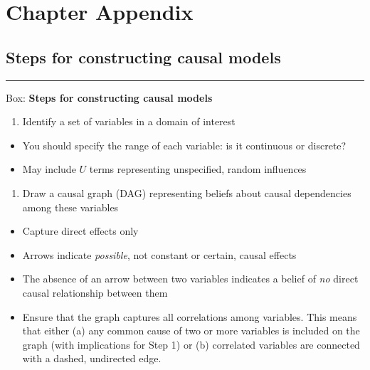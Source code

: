 \documentclass[12pt,]{book}
\providecommand{\tightlist}{%
  \setlength{\itemsep}{0pt}\setlength{\parskip}{0pt}}
\begin{document}
\hypertarget{chapter-appendix}{%
\section{Chapter Appendix}\label{chapter-appendix}}

\hypertarget{steps-for-constructing-causal-models}{%
\subsection{Steps for constructing causal models}\label{steps-for-constructing-causal-models}}

\begin{center}\rule{0.5\linewidth}{\linethickness}\end{center}

Box: \textbf{Steps for constructing causal models}

\begin{enumerate}
\def\labelenumi{\arabic{enumi}.}
\tightlist
\item
  Identify a set of variables in a domain of interest
\end{enumerate}

\begin{itemize}
\tightlist
\item
  You should specify the range of each variable: is it continuous or discrete?
\item
  May include \(U\) terms representing unspecified, random influences
\end{itemize}

\begin{enumerate}
\def\labelenumi{\arabic{enumi}.}
\setcounter{enumi}{1}
\tightlist
\item
  Draw a causal graph (DAG) representing beliefs about causal dependencies among these variables
\end{enumerate}

\begin{itemize}
\tightlist
\item
  Capture direct effects only
\item
  Arrows indicate \emph{possible}, not constant or certain, causal effects
\item
  The absence of an arrow between two variables indicates a belief of \emph{no} direct causal relationship between them
\item
  Ensure that the graph captures all correlations among variables. This means that either (a) any common cause of two or more variables is included on the graph (with implications for Step 1) or (b) correlated variables are connected with a dashed, undirected edge.
\end{itemize}
\end{document}
